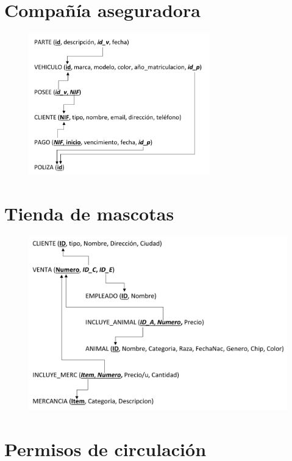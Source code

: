 \documentclass[a4paper]{article}
\begin{document}
\section{Compañía aseguradora}

\begin{figure}[H]
    \includegraphics[width=0.7\textwidth]{figs/comp-aseguradora-sol}
\end{figure}

\section{Tienda de mascotas}

\begin{figure}[H]
    \includegraphics[width=\textwidth]{figs/tienda-de-mascotas-sol}
\end{figure}

\newpage
\section{Permisos de circulación}
\end{document}
